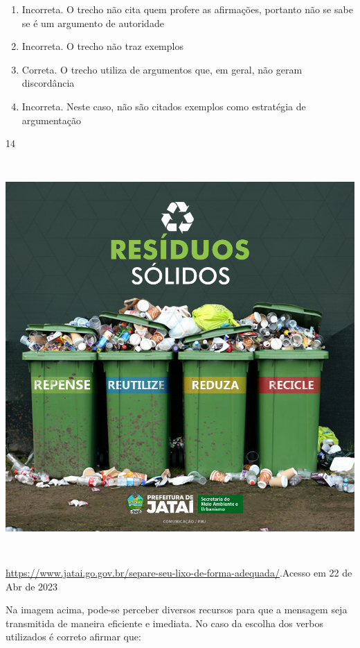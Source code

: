 {{\begin{itemize}
\begin{itemize}
\begin{enumerate}
\def\labelenumi{\arabic{enumi}.}
\item
  Incorreta. O trecho não cita quem profere as afirmações, portanto não
  se sabe se é um argumento de autoridade
\item
  Incorreta. O trecho não traz exemplos
\item
  Correta. O trecho utiliza de argumentos que, em geral, não geram
  discordância
\item
  Incorreta. Neste caso, não são citados exemplos como estratégia de
  argumentação
\end{enumerate}

\num{14}

\includegraphics[width=5.90551in,height=5.90278in]{./imgSAEB_7_POR/media/image19.png}

\href{https://www.jatai.go.gov.br/separe-seu-lixo-de-forma-adequada/}{\uline{https://www.jatai.go.gov.br/separe-seu-lixo-de-forma-adequada/}}.Acesso
em 22 de Abr de 2023

Na imagem acima, pode-se perceber diversos recursos para que a mensagem
seja transmitida de maneira eficiente e imediata. No caso da escolha dos
verbos utilizados é correto afirmar que:


\end{itemize}
\end{itemize}}}
